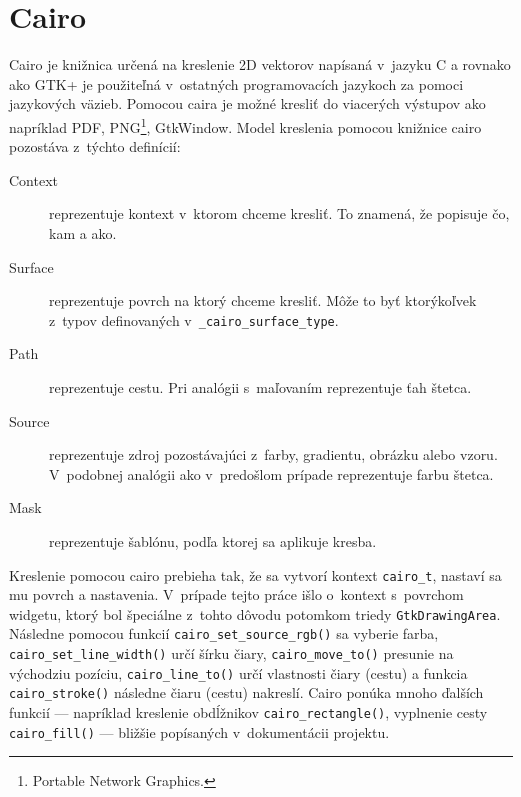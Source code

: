 \documentclass[12pt,oneside,final]{fithesis2}
\begin{document}
\section{Cairo}
Cairo je knižnica určená na kreslenie 2D vektorov napísaná v~jazyku C a rovnako ako GTK+ je použiteľná v~ostatných programovacích jazykoch za pomoci jazykových väzieb. Pomocou caira je možné kresliť do viacerých výstupov ako napríklad PDF, PNG\footnote{Portable Network Graphics.}, GtkWindow. Model kreslenia pomocou knižnice cairo pozostáva z~týchto definícií:
\begin{description}
\item[Context] reprezentuje kontext v~ktorom chceme kresliť. To znamená, že popisuje čo, kam a ako.
\item[Surface] reprezentuje povrch na ktorý chceme kresliť. Môže to byť ktorýkoľvek z~typov definovaných v~\texttt{\_cairo\_surface\_type}.
\item[Path] reprezentuje cestu. Pri analógii s~maľovaním reprezentuje ťah štetca.
\item[Source] reprezentuje zdroj pozostávajúci z~farby, gradientu, obrázku alebo vzoru. V~podobnej analógii ako v~predošlom prípade reprezentuje farbu štetca.
\item[Mask] reprezentuje šablónu, podľa ktorej sa aplikuje kresba.
\end{description}
Kreslenie pomocou cairo prebieha tak, že sa vytvorí kontext \texttt{cairo\_t}, nastaví sa mu povrch a nastavenia. V~prípade tejto práce išlo o~kontext s~povrchom widgetu, ktorý bol špeciálne z~tohto dôvodu potomkom triedy \texttt{GtkDrawingArea}. Následne pomocou funkcií \texttt{cairo\_set\_source\_rgb()} sa vyberie farba, \texttt{cairo\_set\_line\_width()} určí šírku čiary, \texttt{cairo\_move\_to()} presunie na východziu pozíciu, \texttt{cairo\_line\_to()} určí vlastnosti čiary (cestu) a funkcia \texttt{cairo\_stroke()} následne čiaru (cestu) nakreslí. Cairo ponúka mnoho ďalších funkcií --- napríklad kreslenie obdĺžnikov \texttt{cairo\_rectangle()}, vyplnenie cesty \texttt{cairo\_fill()} --- bližšie popísaných v~dokumentácii projektu\cite{cairodoc}.
\end{document}
